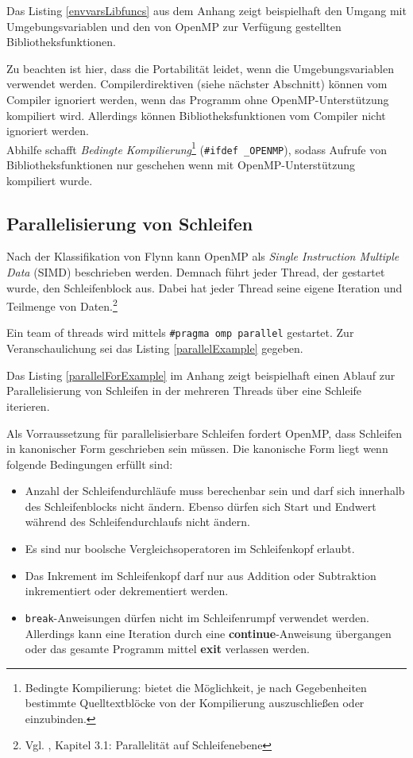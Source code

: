 \documentclass[11pt]{scrartcl}
\begin{document}
Das Listing \ref{envvarsLibfuncs} aus dem Anhang zeigt beispielhaft den Umgang mit Umgebungsvariablen und den von OpenMP zur Verfügung gestellten Bibliotheksfunktionen.

Zu beachten ist hier, dass die Portabilität leidet, wenn die Umgebungsvariablen verwendet werden. Compilerdirektiven (siehe nächster Abschnitt) können vom Compiler ignoriert werden, wenn das Programm ohne OpenMP-Unterstützung kompiliert wird. Allerdings können Bibliotheksfunktionen vom Compiler nicht ignoriert werden. \\
Abhilfe schafft \textit{Bedingte Kompilierung}\footnote{Bedingte Kompilierung: bietet die Möglichkeit, je nach Gegebenheiten bestimmte Quelltextblöcke von der Kompilierung auszuschließen oder einzubinden. } (\texttt{\#ifdef \_OPENMP}), sodass Aufrufe von Bibliotheksfunktionen nur geschehen wenn mit OpenMP-Unterstützung kompiliert wurde. 

\subsection{Parallelisierung von Schleifen} 
Nach der Klassifikation von Flynn kann OpenMP als \emph{Single Instruction Multiple Data} (SIMD) beschrieben werden. Demnach führt jeder Thread, der gestartet wurde, den Schleifenblock aus. Dabei hat jeder Thread seine eigene Iteration und Teilmenge von Daten.\footnote{Vgl. \cite{openmp08}, Kapitel 3.1: Parallelität auf Schleifenebene}

Ein team of threads wird mittels \texttt{\#pragma omp parallel} gestartet. Zur Veranschaulichung sei das Listing \ref{parallelExample} gegeben. 

Das Listing \ref{parallelForExample} im Anhang zeigt beispielhaft einen Ablauf zur Parallelisierung von Schleifen in der mehreren Threads über eine Schleife iterieren.

Als Vorraussetzung für parallelisierbare Schleifen fordert OpenMP, dass Schleifen in kanonischer Form geschrieben sein müssen. Die kanonische Form liegt wenn folgende Bedingungen erfüllt sind: 
\begin{itemize}
\item Anzahl der Schleifendurchläufe muss berechenbar sein und darf sich innerhalb des Schleifenblocks nicht ändern. Ebenso dürfen sich Start und Endwert während des Schleifendurchlaufs nicht ändern.
\item Es sind nur boolsche Vergleichsoperatoren im Schleifenkopf erlaubt.
\item Das Inkrement im Schleifenkopf darf nur aus Addition oder Subtraktion inkrementiert oder dekrementiert werden. 
\item \texttt{break}-Anweisungen dürfen nicht im Schleifenrumpf verwendet werden. Allerdings kann eine Iteration durch eine \textbf{continue}-Anweisung übergangen oder das gesamte Programm mittel \textbf{exit} verlassen werden.
\end{itemize}
\end{document}
